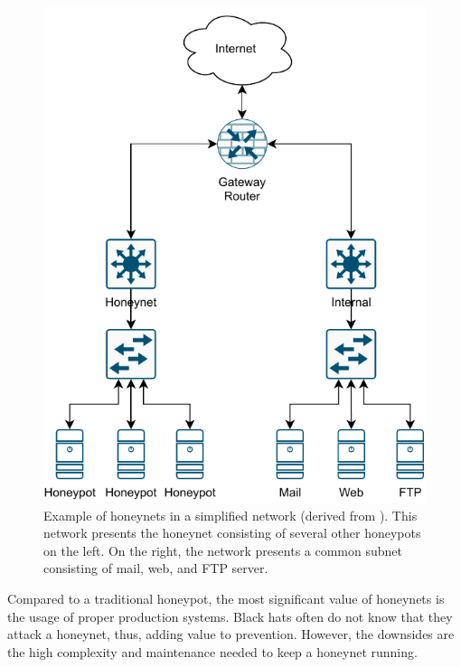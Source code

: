 \begin{figure}
    \centering
    \includegraphics{figures/honeynet-example.pdf}
    \caption[Example of honeynets in a simplified network]{
        Example of honeynets in a simplified network (derived from \cite{Spitzner2003}).
        This network presents the honeynet consisting of several other honeypots on the left.
        On the right, the network presents a common subnet consisting of mail, web, and FTP server.
    }
    \label{fig:honeynet-example}
\end{figure}

Compared to a traditional honeypot, the most significant value of honeynets is the usage of proper production systems.
Black hats often do not know that they attack a honeynet, thus, adding value to prevention.
However, the downsides are the high complexity and maintenance needed to keep a honeynet running. \cite{Spitzner2003}

